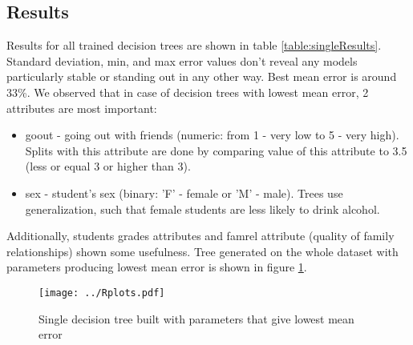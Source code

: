 \documentclass[a4paper]{article}
\begin{document}
\subsection{Results}
\label{singleConc}

Results for all trained decision trees are shown in table \ref{table:singleResults}.
Standard deviation, min, and max error values don't reveal any models
particularly stable or standing out in any other way.
Best mean error is around 33\%.
We observed that in case of decision trees with lowest mean error, 2 attributes are most important:
\begin{itemize}
    \item goout - going out with friends (numeric: from 1 - very low to 5 - very high).
        Splits with this attribute are done by comparing value of this attribute to 3.5
        (less or equal 3 or higher than 3).
    \item sex - student's sex (binary: 'F' - female or 'M' - male).
        Trees use generalization, such that female students are less likely to drink alcohol.
\end{itemize}
Additionally, students grades attributes and famrel attribute (quality of family relationships)
shown some usefulness.
Tree generated on the whole dataset with parameters producing lowest mean error is shown in figure \ref{fig:single}.

\begin{figure}[!hbt]
    \centering
    \texttt{[image: ../Rplots.pdf]}
    \caption[]{Single decision tree built with parameters that give lowest mean error
    \label{fig:single}
    }
\end{figure}

% 
% 
% 
\end{document}
